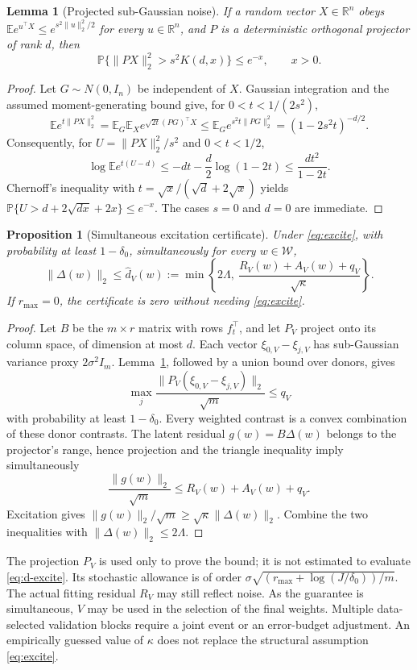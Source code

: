 \documentclass[11pt,a4paper]{article}
\newtheorem{proposition}[theorem]{Proposition}
\newtheorem{lemma}[theorem]{Lemma}
\newcommand{\R}{\mathbb R}
\newcommand{\E}{\mathbb E}
\newcommand{\Prb}{\mathbb P}
\newcommand{\W}{\mathcal W}
\newcommand{\norm}[1]{\lVert#1\rVert}
\begin{document}
\begin{lemma}[Projected sub-Gaussian noise]\label{lem:proj}
If a random vector $X\in\R^n$ obeys
$\E e^{u^\top X}\le e^{s^2\norm u_2^2/2}$ for every $u\in\R^n$, and $P$ is a deterministic orthogonal projector of rank $d$, then
\[
 \Prb\{\norm{PX}_2^2>s^2K(d,x)\}\le e^{-x},\qquad x>0.
\]
\end{lemma}
\begin{proof}
Let $G\sim N(0,I_n)$ be independent of $X$. Gaussian integration and the assumed moment-generating bound give, for $0<t<1/(2s^2)$,
\[
 \E e^{t\norm{PX}_2^2}
 =\E_G\E_X e^{\sqrt{2t}(PG)^\top X}
 \le\E_Ge^{s^2t\norm{PG}_2^2}
 =(1-2s^2t)^{-d/2}.
\]
Consequently, for $U=\norm{PX}_2^2/s^2$ and $0<t<1/2$,
\[
 \log\E e^{t(U-d)}
 \le-dt-\frac d2\log(1-2t)
 \le\frac{dt^2}{1-2t}.
\]
Chernoff's inequality with $t=\sqrt{x}/(\sqrt d+2\sqrt{x})$ yields
$\Prb\{U>d+2\sqrt{dx}+2x\}\le e^{-x}$. The cases $s=0$ and $d=0$ are immediate.
\end{proof}

\begin{proposition}[Simultaneous excitation certificate]\label{prop:excite}
Under \eqref{eq:excite}, with probability at least $1-\delta_0$, simultaneously for every $w\in\W$,
\begin{equation}\label{eq:d-excite}
 \norm{\Delta(w)}_2\le
 \widehat d_V(w):=
 \min\left\{2\Lambda,\ \frac{R_V(w)+A_V(w)+q_V}{\sqrt\kappa}\right\}.
\end{equation}
If $r_{\max}=0$, the certificate is zero without needing \eqref{eq:excite}.
\end{proposition}
\begin{proof}
Let $B$ be the $m\times r$ matrix with rows $f_t^\top$, and let $P_V$ project onto its column space, of dimension at most $d$. Each vector $\xi_{0,V}-\xi_{j,V}$ has sub-Gaussian variance proxy $2\sigma^2I_m$. Lemma~\ref{lem:proj}, followed by a union bound over donors, gives
\[
 \max_j\frac{\norm{P_V(\xi_{0,V}-\xi_{j,V})}_2}{\sqrt m}
 \le q_V
\]
with probability at least $1-\delta_0$. Every weighted contrast is a convex combination of these donor contrasts. The latent residual $g(w)=B\Delta(w)$ belongs to the projector's range, hence projection and the triangle inequality imply simultaneously
\[
 \frac{\norm{g(w)}_2}{\sqrt m}
 \le R_V(w)+A_V(w)+q_V.
\]
Excitation gives $\norm{g(w)}_2/\sqrt m\ge\sqrt\kappa\norm{\Delta(w)}_2$. Combine the two inequalities with $\norm{\Delta(w)}_2\le2\Lambda$.
\end{proof}

The projection $P_V$ is used only to prove the bound; it is not estimated to evaluate \eqref{eq:d-excite}. Its stochastic allowance is of order
$\sigma\sqrt{(r_{\max}+\log(J/\delta_0))/m}$.
The actual fitting residual $R_V$ may still reflect noise. As the guarantee is simultaneous, $V$ may be used in the selection of the final weights. Multiple data-selected validation blocks require a joint event or an error-budget adjustment. An empirically guessed value of $\kappa$ does not replace the structural assumption \eqref{eq:excite}.
\end{document}
